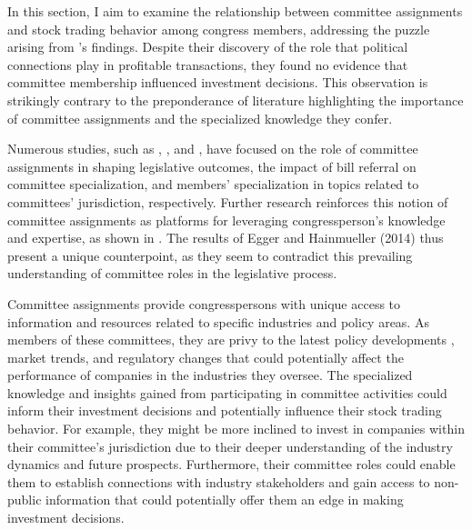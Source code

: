 \documentclass[15pt,letterpaper]{article}
\begin{document}

In this section, I aim to examine the relationship between committee assignments and stock trading behavior among congress members, addressing the puzzle arising from \cite{eg14}'s findings. Despite their discovery of the role that political connections play in profitable transactions, they found no evidence that committee membership influenced investment decisions. This observation is strikingly contrary to the preponderance of literature highlighting the importance of committee assignments and the specialized knowledge they confer.

Numerous studies, such as \cite{patterson1970}, \cite{king1994}, and \cite{asher1974}, have focused on the role of committee assignments in shaping legislative outcomes, the impact of bill referral on committee specialization, and members' specialization in topics related to committees' jurisdiction, respectively. Further research reinforces this notion of committee assignments as platforms for leveraging congressperson's knowledge and expertise, as shown in \cite{10.2307/40709444, 10.2307/2111156, kiewiet1991logic, krehbiel1992information, curry2018knowledge}. The results of Egger and Hainmueller (2014) thus present a unique counterpoint, as they seem to contradict this prevailing understanding of committee roles in the legislative process.


Committee assignments provide congresspersons with unique access to information and resources related to specific industries and policy areas. As members of these committees, they are privy to the latest policy developments \citep{price1978policy}, market trends, and regulatory changes \citep{weiss1989congressional} that could potentially affect the performance of companies in the industries they oversee. The specialized knowledge and insights gained from participating in committee activities could inform their investment decisions and potentially influence their stock trading behavior. For example, they might be more inclined to invest in companies within their committee's jurisdiction due to their deeper understanding of the industry dynamics and future prospects. Furthermore, their committee roles could enable them to establish connections with industry stakeholders and gain access to non-public information that could potentially offer them an edge in making investment decisions.
\end{document}
